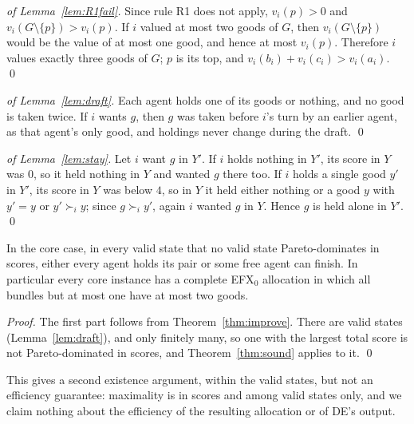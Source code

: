 \documentclass[runningheads,11pt]{llncs}
\newcommand{\efxz}{\texorpdfstring{\mbox{EFX$_0$}}{EFX0}}
\newcommand{\DE}{\textup{DE}}
\begin{document}
\begin{proof}[of Lemma~\ref{lem:R1fail}]
Since rule R1 does not apply, $v_i(p)>0$ and $v_i(G\setminus\{p\})>v_i(p)$. If $i$ valued at most two goods of $G$, then $v_i(G\setminus\{p\})$ would be the value of at most one good, and hence at most $v_i(p)$. Therefore $i$ values exactly three goods of $G$; $p$ is its top, and $v_i(b_i)+v_i(c_i)>v_i(a_i)$. \qed
\end{proof}

\begin{proof}[of Lemma~\ref{lem:draft}]
Each agent holds one of its goods or nothing, and no good is taken twice. If $i$ wants $g$, then $g$ was taken before $i$'s turn by an earlier agent, as that agent's only good, and holdings never change during the draft. \qed
\end{proof}

\begin{proof}[of Lemma~\ref{lem:stay}]
Let $i$ want $g$ in $Y'$. If $i$ holds nothing in $Y'$, its score in $Y$ was $0$, so it held nothing in $Y$ and wanted $g$ there too. If $i$ holds a single good $y'$ in $Y'$, its score in $Y$ was below $4$, so in $Y$ it held either nothing or a good $y$ with $y'=y$ or $y'\succ_i y$; since $g\succ_i y'$, again $i$ wanted $g$ in $Y$. Hence $g$ is held alone in $Y'$. \qed
\end{proof}

\begin{corollary}\label{cor:po}
In the core case, in every valid state that no valid state Pareto-dominates in scores, either every agent holds its pair or some free agent can finish. In particular every core instance has a complete \efxz{} allocation in which all bundles but at most one have at most two goods.
\end{corollary}

\begin{proof}
The first part follows from Theorem~\ref{thm:improve}. There are valid states (Lemma~\ref{lem:draft}), and only finitely many, so one with the largest total score is not Pareto-dominated in scores, and Theorem~\ref{thm:sound} applies to it. \qed
\end{proof}

\noindent This gives a second existence argument, within the valid states, but not an efficiency guarantee: maximality is in scores and among valid states only, and we claim nothing about the efficiency of the resulting allocation or of \DE{}'s output.
\end{document}
